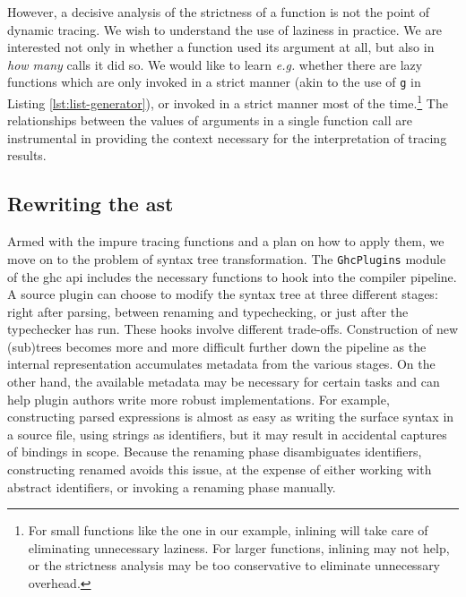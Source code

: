 \documentclass[thesis=B,english]{FITthesis}[2019/12/23]
\newcommand{\eg}{\emph{e.g.}\xspace}
\newcommand{\hsIdent}[1]{\texttt{#1}}
\newcommand{\hsModule}[1]{\texttt{#1}}
\begin{document}
However, a decisive analysis of the strictness of a function is not the point
of dynamic tracing. We wish to understand the use of laziness in practice. We
are interested not only in whether a function used its argument at all, but
also in \textit{how many} calls it did so. We would like to learn \eg whether
there are lazy functions which are only invoked in a strict manner (akin to the
use of \hsIdent{g} in Listing \ref{lst:list-generator}), or invoked in a strict
manner most of the time.\footnote{
	For small functions like the one in our example, inlining will take care of
	eliminating unnecessary laziness. For larger functions, inlining may not
	help, or the strictness analysis may be too conservative to eliminate
	unnecessary overhead.
} The relationships between the values of arguments in a single function call
are instrumental in providing the context necessary for the interpretation of
tracing results.

\subsection*{Rewriting the \acrshort{ast}}
Armed with the impure tracing functions and a plan on how to apply them, we
move on to the problem of syntax tree transformation. The \hsModule{GhcPlugins}
module~\cite{hkg-ghcplugins} of the \acrshort{ghc} \acrshort{api} includes the
necessary functions to hook into the compiler pipeline. A source plugin can
choose to modify the syntax tree at three different stages: right after
parsing, between renaming and typechecking, or just after the typechecker has
run. These hooks involve different trade-offs. Construction of new (sub)trees
becomes more and more difficult further down the pipeline as the internal
representation accumulates metadata from the various stages. On the other hand,
the available metadata may be necessary for certain tasks and can help plugin
authors write more robust implementations. For example, constructing parsed
expressions is almost as easy as writing the surface syntax in a source file,
using strings as identifiers, but it may result in accidental captures of
bindings in scope. Because the renaming phase disambiguates identifiers,
constructing renamed  avoids this issue, at the expense of
either working with abstract identifiers, or invoking a renaming phase
manually.
\end{document}
